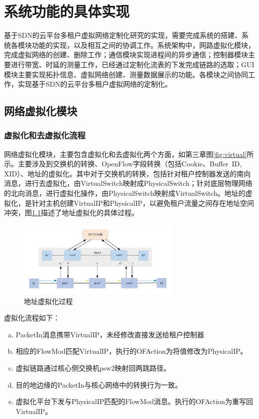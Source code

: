 \chapter{系统功能的具体实现}
基于SDN的云平台多租户虚拟网络定制化研究的实现，需要完成系统的搭建、系统各模块功能的实现，以及相互之间的协调工作。系统架构中，网路虚拟化模块，完成虚拟网络的创建、删除工作；通信模块实现进程间的异步通信；控制器模块主要进行带宽、时延的测量工作，已经通过定制化流表的下发完成链路的选取；GUI模块主要实现拓扑信息、虚拟网络创建、测量数据展示的功能。各模块之间协同工作，实现基于SDN的云平台多租户虚拟网络的定制化。
\section{网络虚拟化模块}
\subsection{虚拟化和去虚拟化流程}
网络虚拟化模块，主要包含虚拟化和去虚拟化两个方面，如第三章图\ref{fig:virtual}所示。主要涉及到交换机的转换、OpenFlow字段转换（包括Cookie、Buffer\ ID, XID）、地址的虚拟化。其中对于交换机的转换，包括针对租户控制器发送的南向消息，进行去虚拟化，由VirtualSwitch映射成PhysicalSwitch；针对底层物理网络的北向消息，进行虚拟化操作，由PhysicalSwitch映射成VirtualSwitch。地址的虚拟化，是针对主机创建VirtualIP和PhysicalIP，以避免租户流量之间存在地址空间冲突，图\ref{fig:addr-vir}描述了地址虚拟化的具体过程。

\begin{figure}[!htb]
  \centering
  \includegraphics[width=0.7\textwidth]{logo/addr_virt}
  \caption{地址虚拟化过程}
  \label{fig:addr-vir}
\end{figure}

虚拟化流程如下：
\begin{enumerate}[a)]
\item PacketIn消息携带VirtualIP，未经修改直接发送给租户控制器
\item 相应的FlowMod匹配VirtualIP，执行的OFAction为将值修改为PhysicalIP。
\item 虚拟链路通过核心侧交换机psw2映射回两跳路径。
\item 目的地边缘的PacketIn与核心网络中的转换行为一致。
\item 虚拟化平台下发与PhysicalIP匹配的FlowMod消息。执行的OFAction为重写回VirtualIP。
\end{enumerate}

